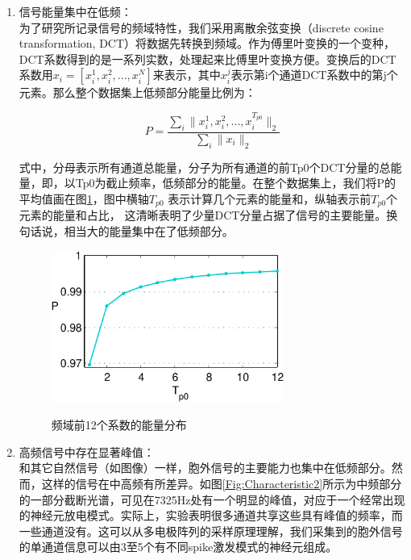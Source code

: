 \begin{enumerate}
\item{信号能量集中在低频：}\\
为了研究所记录信号的频域特性，我们采用离散余弦变换（discrete cosine transformation, DCT）将数据先转换到频域。作为傅里叶变换的一个变种，DCT系数得到的是一系列实数，处理起来比傅里叶变换方便。变换后的DCT系数用${x_i} = [x_i^{1},x_i^{2},...,x_i^{N}]$来表示，其中$x_i^j$表示第i个通道DCT系数中的第j个元素。那么整个数据集上低频部分能量比例为：

\begin{equation}\label{Eq:power Definition}
  P = \frac{\sum_i \|x_i^{1},x_i^{2},...,x_i^{T_{p0}}\|_2}{\sum_i \|x_i\|_2}
\end{equation}
 
式中，分母表示所有通道总能量，分子为所有通道的前Tp0个DCT分量的总能量，即，以Tp0为截止频率，低频部分的能量。在整个数据集上，我们将P的平均值画在图\ref{Fig:Characteristic1}，图中横轴$T_{p0}$ 表示计算几个元素的能量和，纵轴表示前$T_{p0}$个元素的能量和占比， 这清晰表明了少量DCT分量占据了信号的主要能量。换句话说，相当大的能量集中在了低频部分。

\begin{figure}
  \centering
  \includegraphics[width=3in]{Pictures/Compression/f1-crop.pdf}\\
  \caption{频域前12个系数的能量分布}\label{Fig:Characteristic1}
\end{figure}


\item{高频信号中存在显著峰值：}\\
和其它自然信号（如图像）一样，胞外信号的主要能力也集中在低频部分。然而，这样的信号在中高频有所差异。如图\ref{Fig:Characteristic2}所示为中频部分的一部分截断光谱，可见在7325Hz处有一个明显的峰值，对应于一个经常出现的神经元放电模式。实际上，实验表明很多通道共享这些具有峰值的频率，而一些通道没有。这可以从多电极阵列的采样原理理解，我们采集到的胞外信号的单通道信息可以由3至5个有不同spike激发模式的神经元组成。


\end{enumerate}
